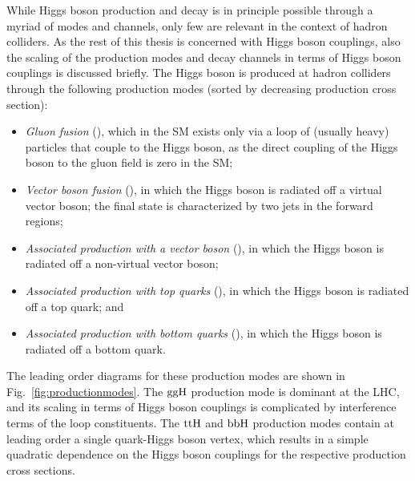 While Higgs boson production and decay is in principle possible through a myriad of modes and channels, only few are relevant in the context of hadron colliders.
% 
As the rest of this thesis is concerned with Higgs boson couplings, also the scaling of the production modes and decay channels in terms of Higgs boson couplings is discussed briefly.
% 
The Higgs boson is produced at hadron colliders through the following production modes (sorted by decreasing production cross section):
% 
\begin{itemize}
\item \textit{Gluon fusion} (\ggh), which in the SM exists only via a loop of (usually heavy) particles that couple to the Higgs boson, as the direct coupling of the Higgs boson to the gluon field is zero in the SM;
% 
\item \textit{Vector boson fusion} (\vbf), in which the Higgs boson is radiated off a virtual vector boson; the final state is characterized by two jets in the forward regions;
% 
\item \textit{Associated production with a vector boson} (\vh), in which the Higgs boson is radiated off a non-virtual vector boson;
% 
\item \textit{Associated production with top quarks} (\tth), in which the Higgs boson is radiated off a top quark; and
% 
\item \textit{Associated production with bottom quarks} (\bbh), in which the Higgs boson is radiated off a bottom quark.
\end{itemize}
% 
The leading order diagrams for these production modes are shown in Fig.~\ref{fig:productionmodes}.
% 
The $\mathrm{g}\mathrm{g}\mathrm{H}$ production mode is dominant at the LHC, and its scaling in terms of Higgs boson couplings is complicated by interference terms of the loop constituents.
% 
The $\mathrm{t}\mathrm{t}\mathrm{H}$ and $\mathrm{b}\mathrm{b}\mathrm{H}$ production modes contain at leading order a single quark-Higgs boson vertex, which results in a simple quadratic dependence on the Higgs boson couplings for the respective production cross sections.


